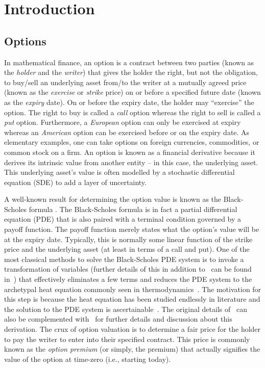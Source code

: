 \chapter{Introduction}
\section{Options}

	In mathematical finance, an option is a contract between two parties (known as the \emph{holder} and the \emph{writer}) that gives the holder the right, but not the obligation, to buy/sell an underlying asset from/to the writer at a mutually agreed price (known as the \emph{exercise} or \emph{strike} price) on or before a specified future date (known as the \emph{expiry} date). On or before the expiry date, the holder may ``exercise'' the option. The right to buy is called a \emph{call} option whereas the right to sell is called a \emph{put} option. Furthermore, a \emph{European} option can only be exercised at expiry whereas an \emph{American} option can be exercised before or on the expiry date. As elementary examples, one can take options on foreign currencies, commodities, or common stock on a firm. An option is known as a financial derivative because it derives its intrinsic value from another entity -- in this case, the underlying asset. This underlying asset's value is often modelled by a stochastic differential equation (SDE) to add a layer of uncertainty. 
	
	A well-known result for determining the option value is known as the Black-Scholes formula \cite{Black1973}. The Black-Scholes formula is in fact a partial differential equation (PDE) that is also paired with a terminal condition governed by a payoff function. The payoff function merely states what the option's value will be at the expiry date. Typically, this is normally some linear function of the strike price and the underlying asset (at least in terms of a call and put). One of the most classical methods to solve the Black-Scholes PDE system is to invoke a transformation of variables (further details of this in addition to~\cite{Black1973} can be found in~\cite{Wilmott1995}) that effectively eliminates a few terms and reduces the PDE system to the archetypal heat equation commonly seen in thermodynamics~\cite{cannon1984one}. The motivation for this step is because the heat equation has been studied endlessly in literature and the solution to the PDE system is ascertainable~\cite{Churchill1938}. The original details of~\cite{Black1973} can also be complemented with~\cite{Wilmott1995} for further details and discussion about this derivation. The crux of option valuation is to determine a fair price for the holder to pay the writer to enter into their specified contract. This price is commonly known as the \emph{option premium} (or simply, the premium) that actually signifies the value of the option at time-zero (i.e., starting today).
	

